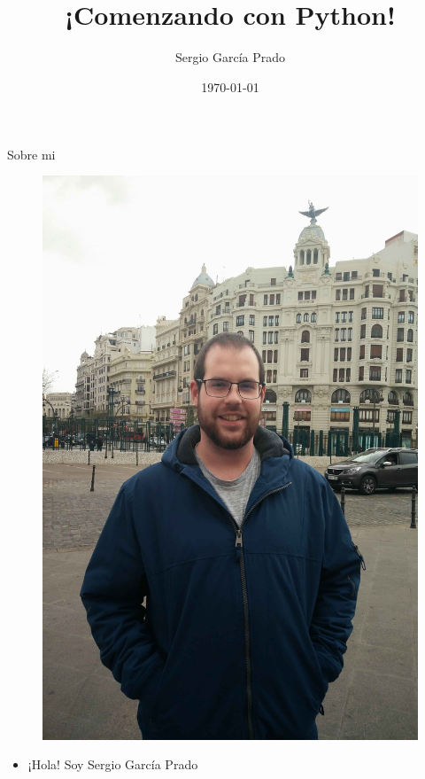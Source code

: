 \documentclass{beamer}
\title{{\Huge\emoji{technologist-light-skin-tone}}\\¡Comenzando con Python!}
\author{Sergio García Prado}
\date{\today}
\begin{document}
    \begin{frame}
        \titlepage
    \end{frame}

    \begin{frame}{Sobre mi}
      \noindent
      \begin{minipage}{.24\textwidth}
          \begin{figure}
            \centering
            \includegraphics[width=\textwidth]{images/photo}
          \end{figure}
      \end{minipage}
      \begin{minipage}{.74\textwidth}
          \begin{itemize}
            \item ¡Hola! Soy Sergio García Prado

\end{itemize}
\end{minipage}
\end{frame}
\end{document}
